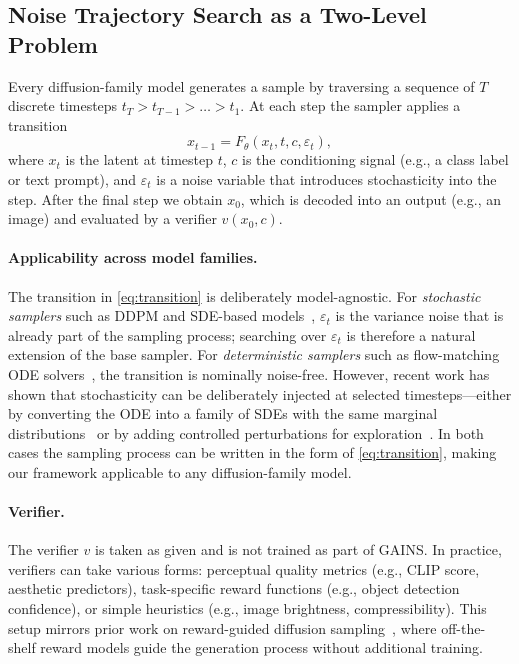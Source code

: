 \subsection{Noise Trajectory Search as a Two-Level Problem}
\label{sec:method-global}

Every diffusion-family model generates a sample by traversing a sequence of
$T$ discrete timesteps $t_T > t_{T-1} > \dots > t_1$.
At each step the sampler applies a transition
\begin{equation}
  x_{t-1} = F_\theta(x_t, t, c, \varepsilon_t),
  \label{eq:transition}
\end{equation}
where $x_t$ is the latent at timestep $t$, $c$ is the conditioning signal
(e.g., a class label or text prompt), and $\varepsilon_t$ is a noise variable
that introduces stochasticity into the step.
After the final step we obtain $x_0$, which is decoded into an output (e.g.,
an image) and evaluated by a verifier $v(x_0, c)$.

\paragraph{Applicability across model families.}
The transition in \cref{eq:transition} is deliberately model-agnostic.
For \emph{stochastic samplers} such as DDPM and SDE-based
models~\citep{ho2020denoising,song2021scorebased}, $\varepsilon_t$ is the
variance noise that is already part of the sampling process; searching over
$\varepsilon_t$ is therefore a natural extension of the base sampler.
For \emph{deterministic samplers} such as flow-matching ODE
solvers~\citep{lipman2023flow,liu2023flow}, the transition is nominally
noise-free. However, recent work has shown that stochasticity can be
deliberately injected at selected timesteps---either by converting the ODE
into a family of SDEs with the same marginal
distributions~\citep{dockhorn2024stochastic} or by adding controlled
perturbations for exploration~\citep{kim2025rbf,black2023training,fan2024reinforcement}.
In both cases the sampling process can be written in the form of
\cref{eq:transition}, making our framework applicable to any diffusion-family
model.

\paragraph{Verifier.}
The verifier $v$ is taken as given and is not trained
as part of GAINS. In practice, verifiers can take various forms:
perceptual quality metrics (e.g., CLIP score, aesthetic
predictors), task-specific reward functions (e.g., object detection confidence),
or simple heuristics (e.g., image brightness, compressibility). This setup
mirrors prior work on reward-guided diffusion
sampling~\citep{clark2024directly,prabhudesai2023aligning,uehara2025tutorial},
where off-the-shelf reward models guide the generation process without
additional training.

